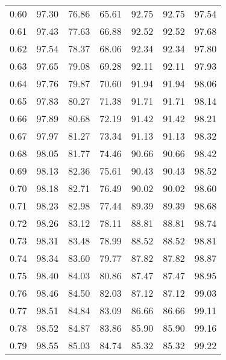 \begin{tabular}{|c|c|c|c|c|c|c|}
      0.60 &     97.30 &     76.86 &      65.61 &   92.75 &      92.75 &         97.54 \\
      0.61 &     97.43 &     77.63 &      66.88 &   92.52 &      92.52 &         97.68 \\
      0.62 &     97.54 &     78.37 &      68.06 &   92.34 &      92.34 &         97.80 \\
      0.63 &     97.65 &     79.08 &      69.28 &   92.11 &      92.11 &         97.93 \\
      0.64 &     97.76 &     79.87 &      70.60 &   91.94 &      91.94 &         98.06 \\
      0.65 &     97.83 &     80.27 &      71.38 &   91.71 &      91.71 &         98.14 \\
      0.66 &     97.89 &     80.68 &      72.19 &   91.42 &      91.42 &         98.21 \\
      0.67 &     97.97 &     81.27 &      73.34 &   91.13 &      91.13 &         98.32 \\
      0.68 &     98.05 &     81.77 &      74.46 &   90.66 &      90.66 &         98.42 \\
      0.69 &     98.13 &     82.36 &      75.61 &   90.43 &      90.43 &         98.52 \\
      0.70 &     98.18 &     82.71 &      76.49 &   90.02 &      90.02 &         98.60 \\
      0.71 &     98.23 &     82.98 &      77.44 &   89.39 &      89.39 &         98.68 \\
      0.72 &     98.26 &     83.12 &      78.11 &   88.81 &      88.81 &         98.74 \\
      0.73 &     98.31 &     83.48 &      78.99 &   88.52 &      88.52 &         98.81 \\
      0.74 &     98.34 &     83.60 &      79.77 &   87.82 &      87.82 &         98.87 \\
      0.75 &     98.40 &     84.03 &      80.86 &   87.47 &      87.47 &         98.95 \\
      0.76 &     98.46 &     84.50 &      82.03 &   87.12 &      87.12 &         99.03 \\
      0.77 &     98.51 &     84.84 &      83.09 &   86.66 &      86.66 &         99.11 \\
      0.78 &     98.52 &     84.87 &      83.86 &   85.90 &      85.90 &         99.16 \\
      0.79 &     98.55 &     85.03 &      84.74 &   85.32 &      85.32 &         99.22 \\

\end{tabular}
